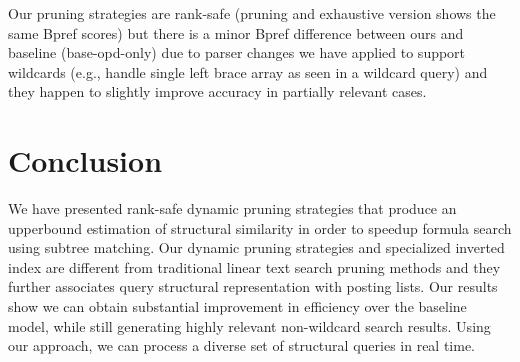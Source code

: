 \documentclass[runningheads]{llncs}
\begin{document}
Our pruning strategies are rank-safe (pruning and exhaustive version shows the same Bpref scores) but there is a minor Bpref difference between ours and baseline (base-opd-only) due to parser changes we have applied to support wildcards (e.g., handle single left brace array as seen in a wildcard query) and they happen to slightly improve accuracy in partially relevant cases.




\section{Conclusion}
We have presented rank-safe dynamic pruning strategies that produce an upperbound estimation of structural similarity in order to speedup formula search using subtree matching.
Our dynamic pruning strategies and specialized inverted index are different from traditional linear text search pruning methods and they further associates query structural representation with posting lists.
Our results show we can obtain substantial improvement in efficiency over the baseline model, while still generating highly relevant non-wildcard search results.
Using our approach, we can process a diverse set of structural queries in real time.


\end{document}
